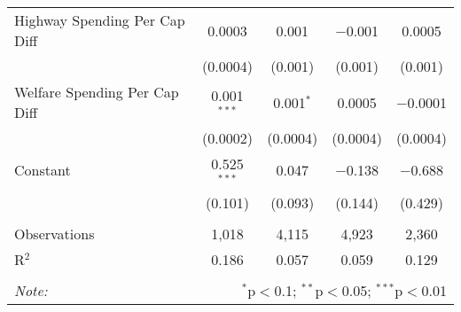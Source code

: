 \begin{table}[!htbp]
\begin{tabular}{@{\extracolsep{5pt}}lcccc}
  Highway Spending Per Cap Diff & 0.0003 & 0.001 & $-$0.001 & 0.0005 \\ 
  & (0.0004) & (0.001) & (0.001) & (0.001) \\ 
  Welfare Spending Per Cap Diff & 0.001$^{***}$ & 0.001$^{*}$ & 0.0005 & $-$0.0001 \\ 
  & (0.0002) & (0.0004) & (0.0004) & (0.0004) \\ 
  Constant & 0.525$^{***}$ & 0.047 & $-$0.138 & $-$0.688 \\ 
  & (0.101) & (0.093) & (0.144) & (0.429) \\ 
 \hline \\[-1.8ex] 
Observations & 1,018 & 4,115 & 4,923 & 2,360 \\ 
R$^{2}$ & 0.186 & 0.057 & 0.059 & 0.129 \\ 
\hline 
\hline \\[-1.8ex] 
\textit{Note:}  & \multicolumn{4}{r}{$^{*}$p$<$0.1; $^{**}$p$<$0.05; $^{***}$p$<$0.01} \\ 
\end{tabular} 
\end{table} 
